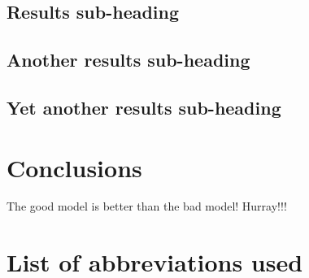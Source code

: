   \subsection*{Results sub-heading}

  \subsection*{Another results sub-heading}

  \subsection*{Yet another results sub-heading}


\section*{Conclusions}
The good model is better than the bad model! Hurray!!! \pb
  

\section*{List of abbreviations used}
    
